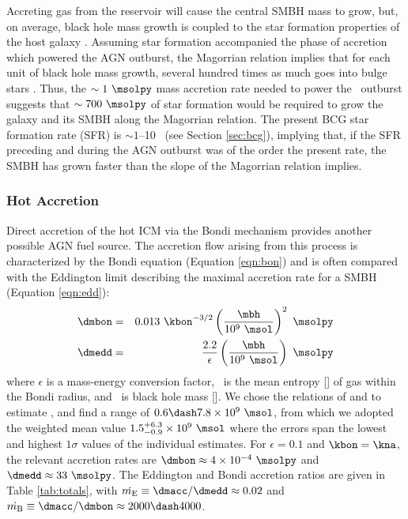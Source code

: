 \documentclass[apjpt4]{aastex}
\begin{document}
Accreting gas from the reservoir will cause the central SMBH mass to
grow, but, on average, black hole mass growth is coupled to the star
formation properties of the host galaxy
\citep[\eg][]{1995ARA&A..33..581K, 2000ApJ...539L...9F}. Assuming star
formation accompanied the phase of accretion which powered the AGN
outburst, the Magorrian relation \citep{magorrian} implies that for
each unit of black hole mass growth, several hundred times as much
goes into bulge stars \citep[\eg][]{2004ApJ...604L..89H}. Thus, the
$\sim 1 ~\msolpy$ mass accretion rate needed to power the
\rbs\ outburst suggests that $\sim 700 ~\msolpy$ of star formation
would be required to grow the galaxy and its SMBH along the Magorrian
relation. The present BCG star formation rate (SFR) is $\sim 1$--10
\msolpy\ (see Section \ref{sec:bcg}), implying that, if the SFR
preceding and during the AGN outburst was of the order the present
rate, the SMBH has grown faster than the slope of the Magorrian
relation implies.

\subsubsection{Hot Accretion}

Direct accretion of the hot ICM via the Bondi mechanism provides
another possible AGN fuel source. The accretion flow arising from this
process is characterized by the Bondi equation (Equation
\ref{eqn:bon}) and is often compared with the Eddington limit
describing the maximal accretion rate for a SMBH (Equation
\ref{eqn:edd}):
\begin{eqnarray}
  \dmbon &=& 0.013 ~\kbon^{-3/2} \left(\frac{\mbh}{10^9
    ~\msol}\right)^{2} ~\msolpy \label{eqn:bon}\\
  \dmedd &=& \frac{2.2}{\epsilon} \left(\frac{\mbh}{10^9~\msol}\right)
  ~\msolpy  \label{eqn:edd}
\end{eqnarray}
where $\epsilon$ is a mass-energy conversion factor, \kbon\ is the
mean entropy [\ent] of gas within the Bondi radius, and \mbh\ is black
hole mass [\msol]. We chose the relations of
\citet{2002ApJ...574..740T} and \citet{2007MNRAS.379..711G} to
estimate \mbh, and find a range of $0.6 \dash 7.8 \times 10^9 ~\msol$,
from which we adopted the weighted mean value $1.5^{+6.3}_{-0.9}
\times 10^9 ~\msol$ where the errors span the lowest and highest
$1\sigma$ values of the individual estimates. For $\epsilon = 0.1$ and
$\kbon = \kna$, the relevant accretion rates are $\dmbon \approx 4
\times 10^{-4} ~\msolpy$ and $\dmedd \approx 33 ~\msolpy$. The
Eddington and Bondi accretion ratios are given in Table
\ref{tab:totals}, with $\dme \equiv \dmacc/\dmedd \approx 0.02$ and
$\dmb \equiv \dmacc/\dmbon \approx 2000 \dash 4000$.
\end{document}
